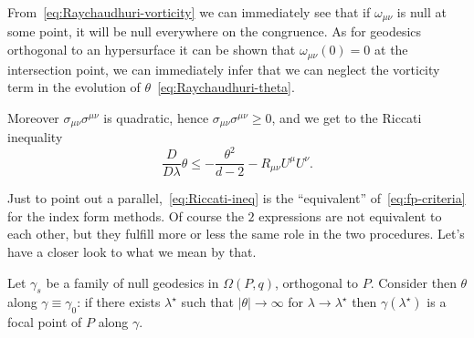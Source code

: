 	From~\eqref{eq:Raychaudhuri-vorticity} we can immediately see that if \(\omega_{\mu\nu}\) is null at some point, it will be null everywhere on the congruence. As for geodesics orthogonal to an hypersurface it can be shown that \(\omega_{\mu\nu}(0) = 0\) at the intersection point, we can immediately infer that we can neglect the vorticity term in the evolution of \(\theta\)~\eqref{eq:Raychaudhuri-theta}.
	
	\noindent Moreover \(\sigma_{\mu\nu}\sigma^{\mu\nu}\) is quadratic, hence \(\sigma_{\mu\nu}\sigma^{\mu\nu} \ge 0\), and we get to the Riccati inequality
	\begin{equation}
		\label{eq:Riccati-ineq}
		\frac{D}{D\lambda}\theta \le -\frac{\theta^2}{d - 2} - R_{\mu\nu}U^{\mu}U^{\nu}.
	\end{equation}
	
	Just to point out a parallel,~\eqref{eq:Riccati-ineq} is the ``equivalent'' of~\eqref{eq:fp-criteria} for the index form methods. Of course the \(2\) expressions are not equivalent to each other, but they fulfill more or less the same role in the two procedures. Let's have a closer look to what we mean by that.
	
	\begin{prop}
		\label{prop:fp-criteria-Raychaudhuri}
		Let \(\gamma_s\) be a family of null geodesics in \(\Omega(P,q)\), orthogonal to \(P\). Consider then \(\theta\) along \(\gamma \equiv \gamma_0\): if there exists \(\lambda^{\star}\) such that \(\vert\theta\vert \rightarrow \infty\) for \(\lambda \rightarrow \lambda^{\star}\) then \(\gamma(\lambda^{\star})\) is a focal point of \(P\) along \(\gamma\).
	\end{prop}

